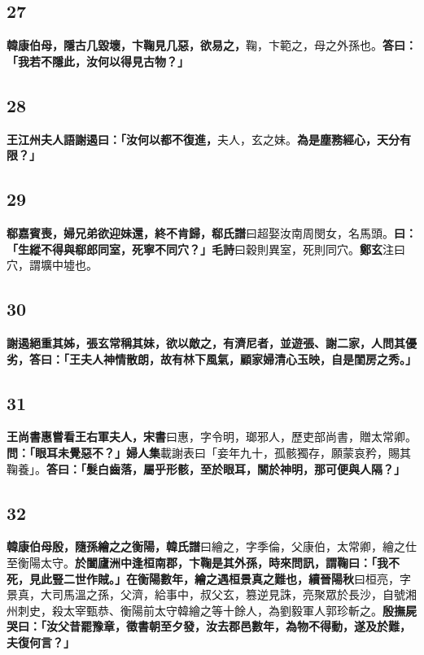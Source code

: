 \subsection*{27}

\textbf{韓康伯母，隱古几毀壞，卞鞠見几惡，欲易之，}{\footnotesize 鞠，卞範之，母之外孫也。}\textbf{答曰：「我若不隱此，汝何以得見古物？」}

\subsection*{28}

\textbf{王江州夫人語謝遏曰：「汝何以都不復進，}{\footnotesize 夫人，玄之妹。}\textbf{為是塵務經心，天分有限？」}

\subsection*{29}

\textbf{郗嘉賓喪，婦兄弟欲迎妹還，終不肯歸，}{\footnotesize \textbf{郗氏譜}曰超娶汝南周閔女，名馬頭。}\textbf{曰：「生縱不得與郗郎同室，死寧不同穴？」}{\footnotesize \textbf{毛詩}曰穀則異室，死則同穴。\textbf{鄭玄}注曰穴，謂壙中墟也。}

\subsection*{30}

\textbf{謝遏絕重其姊，張玄常稱其妹，欲以敵之，有濟尼者，並遊張、謝二家，人問其優劣，答曰：「王夫人神情散朗，故有林下風氣，顧家婦清心玉映，自是閨房之秀。」}

\subsection*{31}

\textbf{王尚書惠嘗看王右軍夫人，}{\footnotesize \textbf{宋書}曰惠，字令明，瑯邪人，歷吏部尚書，贈太常卿。}\textbf{問：「眼耳未覺惡不？」}{\footnotesize \textbf{婦人集}載謝表曰「妾年九十，孤骸獨存，願蒙哀矜，賜其鞠養」。}\textbf{答曰：「髮白齒落，屬乎形骸，至於眼耳，關於神明，那可便與人隔？」}

\subsection*{32}

\textbf{韓康伯母殷，隨孫繪之之衡陽，}{\footnotesize \textbf{韓氏譜}曰繪之，字季倫，父康伯，太常卿，繪之仕至衡陽太守。}\textbf{於闔廬洲中逢桓南郡，卞鞠是其外孫，時來問訊，謂鞠曰：「我不死，見此豎二世作賊。」在衡陽數年，繪之遇桓景真之難也，}{\footnotesize \textbf{續晉陽秋}曰桓亮，字景真，大司馬溫之孫，父濟，給事中，叔父玄，篡逆見誅，亮聚眾於長沙，自號湘州刺史，殺太宰甄恭、衡陽前太守韓繪之等十餘人，為劉毅軍人郭珍斬之。}\textbf{殷撫屍哭曰：「汝父昔罷豫章，徵書朝至夕發，汝去郡邑數年，為物不得動，遂及於難，夫復何言？」}